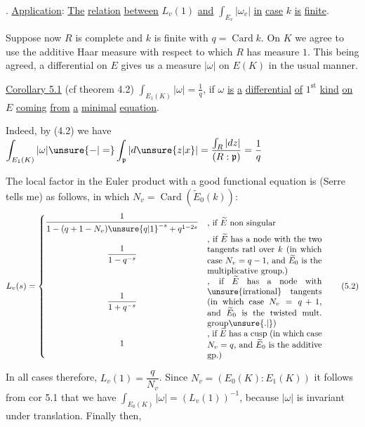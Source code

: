 \makeatletter\tagsleft@true{}. \uline{Application}: \uline{The} \uline{relation} \uline{between} $L_v(1)$ \uline{and} $\int_{E_v}|\omega_v|$ \uline{in} \uline{case} $k$ \uline{is} \uline{finite}.

Suppose now $R$ is complete and $k$ is finite with $q=\operatorname{Card} k$. On $K$ we agree to use the additive Haar measure with respect to which $R$ has measure $1$. This being agreed, a differential \inserted{$\omega$} on $E$ gives us a measure $|\omega|$ on $E(K)$ in the usual manner.

\uline{Corollary 5.1} (cf theorem 4.2) $\displaystyle\int_{E_1(K)}|\omega|=\frac{1}{q}$, if $\omega$ \uline{is} \uline{a} \uline{differential} \uline{of} $1^{\mathrm{st}}$ \uline{kind} \uline{on} $E$ \uline{coming} \uline{from} \uline{a} \uline{minimal} \uline{equation}.

Indeed, by (4.2) we have $\displaystyle\int_{E_1(K)}|\omega|\unsure{-|=}\int_{\mathfrak p}|d\unsure{z|x}|=\frac{\int_R|dz|}{(R:\mathfrak p)}=\frac{1}{q}$

The local factor  in the Euler product with a good functional equation is (Serre tells me) as follows, in which $N_v=\operatorname{Card}(\widetilde E_0(k))$:
{\small
\[
L_v(s)=\left\{
\begin{array}{@{}c@{\quad}l@{}}
\dfrac{1}{1-(q+1-N_v){\unsure{q|1}}^{-s}+q^{1-2s}}
 & \parbox{.39\linewidth}{, if $\widetilde E$ non singular}\\[1.0ex]
\dfrac{1}{1-q^{-s}}
 & \parbox{.39\linewidth}{, if $\widetilde E$ has a node with the two tangents ratl over $k$ (in which case $N_v=q-1$, and $\widetilde E_0$ is the multiplicative group.)}\\[1.0ex]
\dfrac{1}{1+q^{-s}}
 & \parbox{.39\linewidth}{, if $\widetilde E$ has a node with \unsure{irrational} tangents (in which case $N_v=q+1$, and $\widetilde E_0$ is the twisted mult. group\unsure{.|{}})}\\[1.0ex]
1 & \parbox{.39\linewidth}{, if $\widetilde E$ has a cusp (in which case $N_v=q$, and $\widetilde E_0$ is the additive gp.)}
\end{array}\right.
\tag*{(5.2)}
\]
}

In all cases therefore, $L_v(1)=\dfrac{q}{N_v}$. Since $N_v=(E_0(K):E_1(K))$\unsure{:|{}} it follows from cor 5.1 that we have $\displaystyle\int_{E_0(K)}|\omega|=(L_v(1))^{-1}$, because $|\omega|$ is invariant under translation. Finally then,

